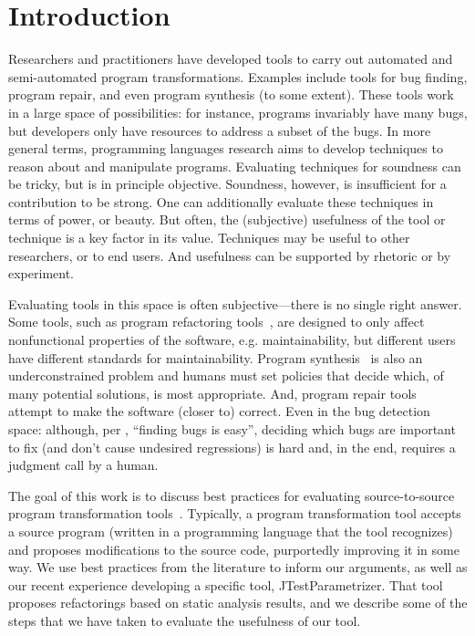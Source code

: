 \section{Introduction}
Researchers and practitioners have developed tools to carry out
automated and semi-automated program transformations.  Examples
include tools for bug finding, program repair, and even 
program synthesis (to some extent). These tools work in a large space of possibilities:
for instance, programs invariably have many bugs, but developers only have resources
to address a subset of the bugs.
In more general terms, programming languages research aims to develop
techniques to reason about and manipulate programs. Evaluating
techniques for soundness can be tricky, but is in principle
objective. Soundness, however, is insufficient for a contribution to
be strong. One can additionally evaluate these techniques in terms of
power, or beauty. But often, the (subjective) usefulness of the tool or technique
is a key factor in its value. Techniques may be useful to other researchers, or to
end users. And usefulness can be supported by rhetoric or by
experiment. 

Evaluating tools in this space is often subjective---there is no
single right answer. Some tools, such as program refactoring tools~\cite{ivers22:_indus_cry_tools_suppor_large_scale_refac},
are designed to only affect nonfunctional properties of the
software, e.g. maintainability, but different users have
different standards for maintainability. Program synthesis~\cite{solar-lezama08:_progr_synth_sketc} is also an
underconstrained problem and humans must set policies that decide which, of many
potential solutions, is most appropriate. And, program repair
tools~\cite{griesmayer06:_repair_boolean_progr_applic_c} 
attempt to make the software (closer to) correct. Even in 
the bug detection space: although, per 
, ``finding bugs is
easy'', deciding which bugs are
important to fix (and don't cause undesired regressions) is hard and,
in the end, requires a judgment call by a human.

The goal of this work is to discuss best practices for evaluating
source-to-source program transformation tools~\cite{visser04:_progr_trans}. Typically, a program
transformation tool accepts a source program (written in a programming
language that the tool recognizes) and proposes modifications to the source code,
purportedly improving it in some way.
We use best practices from the literature
to inform our arguments, as well as our recent experience developing
a specific tool, JTestParametrizer. That tool proposes
refactorings based on static analysis results, and we describe some of the
steps that we have taken to evaluate the usefulness of our tool.

